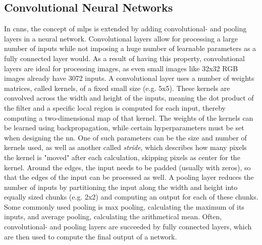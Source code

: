 \subsection{Convolutional Neural Networks}
In \ac{cnn}s, the concept of \ac{mlp}s is extended by adding convolutional- and pooling layers in a neural network. Convolutional layers allow for processing a large number of inputs while not imposing a huge number of learnable parameters as a fully connected layer would. As a result of having this property, convolutional layers are ideal for processing images, as even small images like 32x32 RGB images already have 3072 inputs.
A convolutional layer uses a number of weights matrices, called kernels, of a fixed small size (e.g. 5x5). These kernels are convolved across the width and height of the inputs, meaning the dot product of the filter and a specific local region is computed for each input, thereby computing a two-dimensional map of that kernel. The weights of the kernels can be learned using backpropagation, while certain hyperparameters must be set when designing the \ac{nn}. One of such parameters can be the size and number of kernels used, as well as another called \emph{stride}, which describes how many pixels the kernel is "moved" after each calculation, skipping pixels as center for the kernel. Around the edges, the input needs to be padded (usually with zeros), so that the edges of the input can be processed as well.
A pooling layer reduces the number of inputs by partitioning the input along the width and height into equally sized chunks (e.g. 2x2) and computing an output for each of these chunks. Some commonly used pooling is max pooling, calculating the maximum of its inputs, and average pooling, calculating the arithmetical mean.
Often, convolutional- and pooling layers are succeeded by fully connected layers, which are then used to compute the final output of a network.




%


